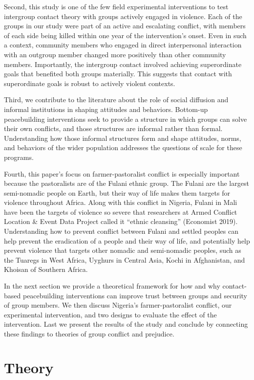 \documentclass[11pt]{article}
\begin{document}
Second, this study is one of the few field experimental interventions to
test intergroup contact theory with groups actively engaged in violence.
Each of the groups in our study were part of an active and escalating
conflict, with members of each side being killed within one year of the
intervention's onset. Even in such a context, community members who
engaged in direct interpersonal interaction with an outgroup member
changed more positively than other community members. Importantly, the
intergroup contact involved achieving superordinate goals that benefited
both groups materially. This suggests that contact with superordinate
goals is robust to actively violent contexts.

Third, we contribute to the literature about the role of social
diffusion and informal institutions in shaping attitudes and behaviors.
Bottom-up peacebuilding interventions seek to provide a structure in
which groups can solve their own conflicts, and those structures are
informal rather than formal. Understanding how those informal structures
form and shape attitudes, norms, and behaviors of the wider population
addresses the questions of scale for these programs.

Fourth, this paper's focus on farmer-pastoralist conflict is especially
important because the pastoralists are of the Fulani ethnic group. The
Fulani are the largest semi-nomadic people on Earth, but their way of
life makes them targets for violence throughout Africa. Along with this
conflict in Nigeria, Fulani in Mali have been the targets of violence so
severe that researchers at Armed Conflict Location \& Event Data Project
called it ``ethnic cleansing'' (Economist 2019). Understanding how to
prevent conflict between Fulani and settled peoples can help prevent the
eradication of a people and their way of life, and potentially help
prevent violence that targets other nomadic and semi-nomadic peoples,
such as the Tuaregs in West Africa, Uyghurs in Central Asia, Kochi in
Afghanistan, and Khoisan of Southern Africa.

In the next section we provide a theoretical framework for how and why
contact-based peacebuilding interventions can improve trust between
groups and security of group members. We then discuss Nigeria's
farmer-pastoralist conflict, our experimental intervention, and two
designs to evaluate the effect of the intervention. Last we present the
results of the study and conclude by connecting these findings to
theories of group conflict and prejudice.

\section{Theory}\label{theory}
\end{document}
